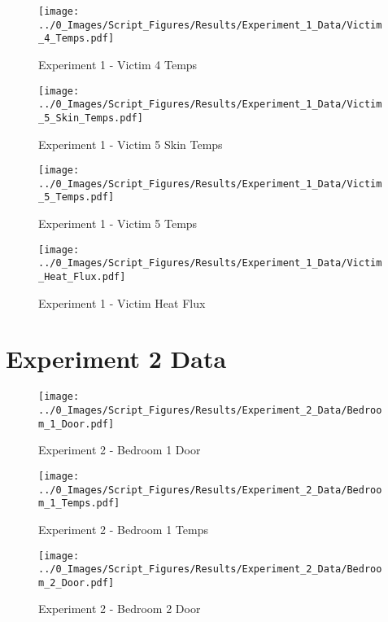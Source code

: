 	\begin{figure}[H]
		\centering
		\texttt{[image: ../0\_Images/Script\_Figures/Results/Experiment\_1\_Data/Victim\_4\_Temps.pdf]}
		\caption[]{Experiment 1 - Victim 4 Temps}
	\end{figure}
 
	\clearpage

	\begin{figure}[H]
		\centering
		\texttt{[image: ../0\_Images/Script\_Figures/Results/Experiment\_1\_Data/Victim\_5\_Skin\_Temps.pdf]}
		\caption[]{Experiment 1 - Victim 5 Skin Temps}
	\end{figure}
 

	\begin{figure}[H]
		\centering
		\texttt{[image: ../0\_Images/Script\_Figures/Results/Experiment\_1\_Data/Victim\_5\_Temps.pdf]}
		\caption[]{Experiment 1 - Victim 5 Temps}
	\end{figure}
 
	\clearpage

	\begin{figure}[H]
		\centering
		\texttt{[image: ../0\_Images/Script\_Figures/Results/Experiment\_1\_Data/Victim\_Heat\_Flux.pdf]}
		\caption[]{Experiment 1 - Victim Heat Flux}
	\end{figure}
 

\clearpage		\large
\section{Experiment 2 Data} \label{App:Exp2Results} 

	\begin{figure}[H]
		\centering
		\texttt{[image: ../0\_Images/Script\_Figures/Results/Experiment\_2\_Data/Bedroom\_1\_Door.pdf]}
		\caption[]{Experiment 2 - Bedroom 1 Door}
	\end{figure}
 

	\begin{figure}[H]
		\centering
		\texttt{[image: ../0\_Images/Script\_Figures/Results/Experiment\_2\_Data/Bedroom\_1\_Temps.pdf]}
		\caption[]{Experiment 2 - Bedroom 1 Temps}
	\end{figure}
 
	\clearpage

	\begin{figure}[H]
		\centering
		\texttt{[image: ../0\_Images/Script\_Figures/Results/Experiment\_2\_Data/Bedroom\_2\_Door.pdf]}
		\caption[]{Experiment 2 - Bedroom 2 Door}
	\end{figure}
 

